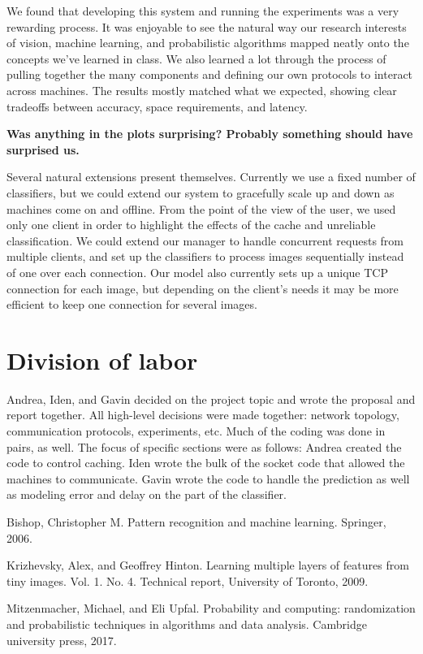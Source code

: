 \documentclass[12pt]{article}
\begin{document}
We found that developing this system and running the experiments was a very rewarding process.
It was enjoyable to see the natural way our research interests of vision, machine learning, and probabilistic algorithms mapped neatly onto the concepts we've learned in class.
We also learned a lot through the process of pulling together the many components and defining our own protocols to interact across machines.
The results mostly matched what we expected, showing clear tradeoffs between accuracy, space requirements, and latency.

{\bf Was anything in the plots surprising?
Probably something should have surprised us.}

Several natural extensions present themselves.
Currently we use a fixed number of classifiers, but we could extend our system to gracefully scale up and down as machines come on and offline.
From the point of the view of the user, we used only one client in order to highlight the effects of the cache and unreliable classification.
We could extend our manager to handle concurrent requests from multiple clients, and set up the classifiers to process images sequentially instead of one over each connection.
Our model also currently sets up a unique TCP connection for each image, but depending on the client's needs it may be more efficient to keep one connection for several images.

\section{Division of labor}

Andrea, Iden, and Gavin decided on the project topic and wrote the proposal and report together.
All high-level decisions were made together: network topology, communication protocols, experiments, etc.
Much of the coding was done in pairs, as well.
The focus of specific sections were as follows: Andrea created the code to control caching.
Iden wrote the bulk of the socket code that allowed the machines to communicate.
Gavin wrote the code to handle the prediction as well as modeling error and delay on the part of the classifier.


\footnotesize\begin{thebibliography}{1}
    Bishop, Christopher M. Pattern recognition and machine learning. Springer, 2006.

    Krizhevsky, Alex, and Geoffrey Hinton. Learning multiple layers of features from tiny images. Vol. 1. No. 4. Technical report, University of Toronto, 2009.

    Mitzenmacher, Michael, and Eli Upfal. Probability and computing: randomization and probabilistic techniques in algorithms and data analysis. Cambridge university press, 2017.

\end{thebibliography}
\end{document}
